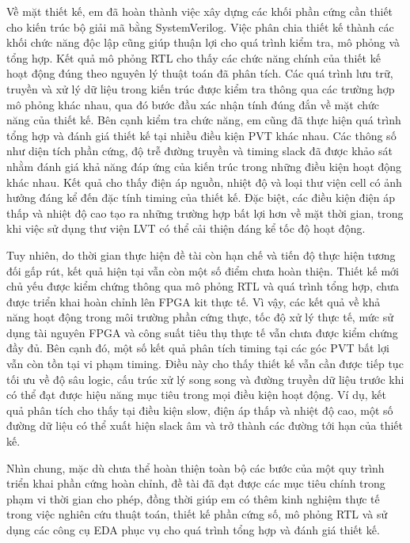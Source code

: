 \documentclass[12pt,a4paper,oneside]{book}
\begin{document}
Về mặt thiết kế, em đã hoàn thành việc xây dựng các khối phần cứng cần thiết cho kiến trúc bộ giải mã bằng SystemVerilog. Việc phân chia thiết kế thành các khối chức năng độc lập cũng giúp thuận lợi cho quá trình kiểm tra, mô phỏng và tổng hợp. Kết quả mô phỏng RTL cho thấy các chức năng chính của thiết kế hoạt động đúng theo nguyên lý thuật toán đã phân tích. Các quá trình lưu trữ, truyền và xử lý dữ liệu trong kiến trúc được kiểm tra thông qua các trường hợp mô phỏng khác nhau, qua đó bước đầu xác nhận tính đúng đắn về mặt chức năng của thiết kế. Bên cạnh kiểm tra chức năng, em cũng đã thực hiện quá trình tổng hợp và đánh giá thiết kế tại nhiều điều kiện PVT khác nhau. Các thông số như diện tích phần cứng, độ trễ đường truyền và timing slack đã được khảo sát nhằm đánh giá khả năng đáp ứng của kiến trúc trong những điều kiện hoạt động khác nhau. Kết quả cho thấy điện áp nguồn, nhiệt độ và loại thư viện cell có ảnh hưởng đáng kể đến đặc tính timing của thiết kế. Đặc biệt, các điều kiện điện áp thấp và nhiệt độ cao tạo ra những trường hợp bất lợi hơn về mặt thời gian, trong khi việc sử dụng thư viện LVT có thể cải thiện đáng kể tốc độ hoạt động.

Tuy nhiên, do thời gian thực hiện đề tài còn hạn chế và tiến độ thực hiện tương đối gấp rút, kết quả hiện tại vẫn còn một số điểm chưa hoàn thiện. Thiết kế mới chủ yếu được kiểm chứng thông qua mô phỏng RTL và quá trình tổng hợp, chưa được triển khai hoàn chỉnh lên FPGA kit thực tế. Vì vậy, các kết quả về khả năng hoạt động trong môi trường phần cứng thực, tốc độ xử lý thực tế, mức sử dụng tài nguyên FPGA và công suất tiêu thụ thực tế vẫn chưa được kiểm chứng đầy đủ. Bên cạnh đó, một số kết quả phân tích timing tại các góc PVT bất lợi vẫn còn tồn tại vi phạm timing. Điều này cho thấy thiết kế vẫn cần được tiếp tục tối ưu về độ sâu logic, cấu trúc xử lý song song và đường truyền dữ liệu trước khi có thể đạt được hiệu năng mục tiêu trong mọi điều kiện hoạt động. Ví dụ, kết quả phân tích cho thấy tại điều kiện slow, điện áp thấp và nhiệt độ cao, một số đường dữ liệu có thể xuất hiện slack âm và trở thành các đường tới hạn của thiết kế.

Nhìn chung, mặc dù chưa thể hoàn thiện toàn bộ các bước của một quy trình triển khai phần cứng hoàn chỉnh, đề tài đã đạt được các mục tiêu chính trong phạm vi thời gian cho phép, đồng thời giúp em có thêm kinh nghiệm thực tế trong việc nghiên cứu thuật toán, thiết kế phần cứng số, mô phỏng RTL và sử dụng các công cụ EDA phục vụ cho quá trình tổng hợp và đánh giá thiết kế.
\end{document}
